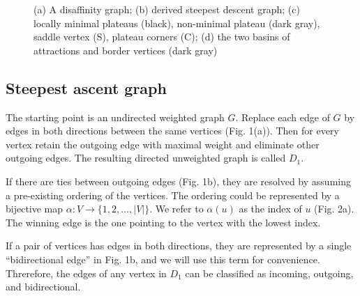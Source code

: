 \documentclass{article}
\begin{document}
\begin{figure}

  \protect\caption{(a) A disaffinity graph; (b) derived steepest
    descent graph; (c) locally minimal plateaus (black), non-minimal
    plateau (dark gray), saddle vertex (S), plateau corners (C); (d)
    the two basins of attractions and border vertices (dark gray)}
\end{figure}

\subsection{Steepest ascent graph}
The starting point is an undirected weighted graph $G$.  Replace each
edge of $G$ by edges in both directions between the same vertices
(Fig. 1(a)).  Then for every vertex retain the outgoing edge with
maximal weight and eliminate other outgoing edges.  The resulting
directed unweighted graph is called $D_1$.

If there are ties between outgoing edges (Fig. 1b), they are resolved
by assuming a pre-existing ordering of the vertices.  The ordering
could be represented by a bijective map
$\alpha:V\to\{1,2,...,|V|\}$. We refer to $\alpha(u)$ as the index of
$u$ (Fig. 2a).  The winning edge is the one pointing to the vertex
with the lowest index.

If a pair of vertices has edges in both directions, they are
represented by a single ``bidirectional edge'' in Fig. 1b, and we will
use this term for convenience.  Threrefore, the edges of any vertex in
$D_1$ can be classified as incoming, outgoing, and bidirectional.
\end{document}
